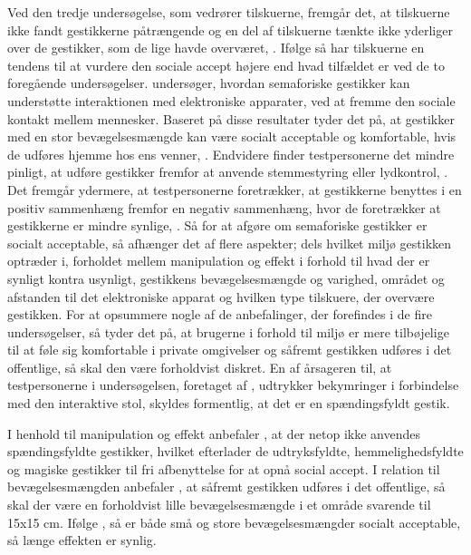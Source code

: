 Ved den tredje undersøgelse, som vedrører tilskuerne, fremgår det, at tilskuerne ikke fandt gestikkerne påtrængende og en del af tilskuerne tænkte ikke yderliger over de gestikker, som de lige havde overværet, \parencite[s. 200]{PDF:AreYouComfortableDoingThat}. Ifølge \textcite[s. 200]{PDF:AreYouComfortableDoingThat} så har tilskuerne en tendens til at vurdere den sociale accept højere end hvad tilfældet er ved de to foregående undersøgelser. \blankline
%
\textcite{PDF:AnExploratoryStudy} undersøger, hvordan semaforiske gestikker kan understøtte interaktionen med elektroniske apparater, ved at fremme den sociale kontakt mellem mennesker. Baseret på disse resultater tyder det på, at gestikker med en stor bevægelsesmængde kan være socialt acceptable og komfortable, hvis de udføres hjemme hos ens venner, \parencite[s. 4]{PDF:AnExploratoryStudy}. Endvidere finder testpersonerne det mindre pinligt, at udføre gestikker fremfor at anvende stemmestyring eller lydkontrol, \parencite[s. 4]{PDF:AnExploratoryStudy}. Det fremgår ydermere, at testpersonerne foretrækker, at gestikkerne benyttes i en positiv sammenhæng fremfor en negativ sammenhæng, hvor de foretrækker at gestikkerne er mindre synlige, \parencite[s. 4]{PDF:AnExploratoryStudy}. \blankline
%
Så for at afgøre om semaforiske gestikker er socialt acceptable, så afhænger det af flere aspekter; dels hvilket miljø gestikken optræder i, forholdet mellem manipulation og effekt i forhold til hvad der er synligt kontra usynligt, gestikkens bevægelsesmængde og varighed, området og afstanden til det elektroniske apparat og hvilken type tilskuere, der overvære gestikken. For at opsummere nogle af de anbefalinger, der forefindes i de fire undersøgelser, så tyder det på, at brugerne i forhold til miljø er mere tilbøjelige til at føle sig komfortable i private omgivelser og såfremt gestikken udføres i det offentlige, så skal den være forholdvist diskret. En af årsageren til, at testpersonerne i undersøgelsen, foretaget af \textcite[s. 4]{PDF:AChairAsUbiquitousInputDevice}, udtrykker bekymringer i forbindelse med den interaktive stol, skyldes formentlig, at det er en spændingsfyldt gestik.

I henhold til manipulation og effekt anbefaler \textcite[s. 278]{PDF:WouldYouDoThat}, at der netop ikke anvendes spændingsfyldte gestikker, hvilket efterlader de udtryksfyldte, hemmelighedsfyldte og magiske gestikker til fri afbenyttelse for at opnå social accept. I relation til bevægelsesmængden anbefaler \textcite[s. 201]{PDF:AreYouComfortableDoingThat}, at såfremt gestikken udføres i det offentlige, så skal der være en forholdvist lille bevægelsesmængde i et område svarende til 15x15 cm. Ifølge \textcite[s. 278]{PDF:WouldYouDoThat}, så er både små og store bevægelsesmængder socialt acceptable, så længe effekten er synlig.

